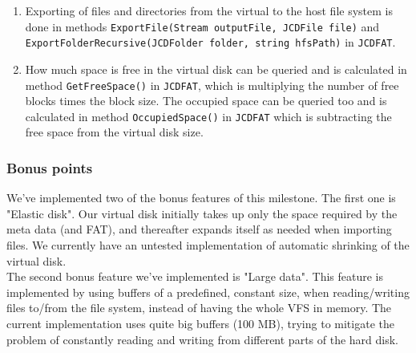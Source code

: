 \documentclass[a4paper,12pt]{article}
\begin{document}
\begin{enumerate}
	\item Exporting of files and directories from the virtual to the host file system is done in methods \texttt{ExportFile(Stream outputFile, JCDFile file)} and \texttt{ExportFolderRecursive(JCDFolder folder, string hfsPath)} in \texttt{JCDFAT}.
	\item How much space is free in the virtual disk can be queried and is calculated in method \texttt{GetFreeSpace()} in \texttt{JCDFAT}, which is multiplying the number of free blocks times the block size. The occupied space can be queried too and is calculated in method \texttt{OccupiedSpace()} in \texttt{JCDFAT} which is subtracting the free space from the virtual disk size.
\end{enumerate}

\subsubsection{Bonus points}
We've implemented two of the bonus features of this milestone. The first one is "Elastic disk". Our virtual disk initially takes up only the space required by the meta data (and FAT), and thereafter expands itself as needed when importing files. We currently have an untested implementation of automatic shrinking of the virtual disk.\\
The second bonus feature we've implemented is "Large data". This feature is implemented by using buffers of a predefined, constant size, when reading/writing files to/from the file system, instead of having the whole VFS in memory. The current implementation uses quite big buffers (100 MB), trying to mitigate the problem of constantly reading and writing from different parts of the hard disk.
\end{document}
